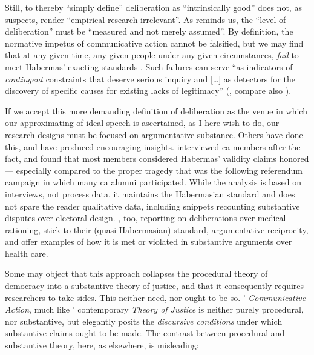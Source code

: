Still, to thereby ``simply define'' deliberation as ``intrinsically good'' does not, as \citet[524]{Mutz2008} suspects, render ``empirical research irrelevant''.
As \citet[13]{Steiner2012} reminds us, the ``level of deliberation'' must be ``measured and not merely assumed''.
By definition, the normative impetus of communicative action cannot be falsified, but we may find that at any given time, any given people under any given circumstances, \emph{fail} to meet Habermas' exacting standards \citep[499]{Thompson2008}.
Such failures can serve ``as indicators of \emph{contingent} constraints that deserve serious inquiry and [\ldots] as detectors for the discovery of specific causes for existing lacks of legitimacy'' (\citealt[420, emphasis in original]{Habermas2006}, compare also \citealt[502]{Thompson2008}).

If we accept this more demanding definition of deliberation as the venue in which our approximating of ideal speech is ascertained, as I here wish to do, our research designs must be focused on argumentative substance.
Others have done this, and have produced encouraging insights.
\cite{Ratner-2008-aa} interviewed \gls{ca} members after the fact, and found that most members considered Habermas' validity claims honored --- especially compared to the proper tragedy that was the following referendum campaign in which many \gls{ca} alumni participated.
While the analysis is based on interviews, not process data, it maintains the Habermasian standard and does not spare the reader qualitative data, including snippets recounting substantive disputes over electoral design.
\cite{GutmannThompson-2004-aa}, too, reporting on deliberations over medical rationing, stick to their (quasi-Habermasian) standard, argumentative reciprocity, and offer examples of how it is met or violated in substantive arguments over health care.

Some may object that this approach collapses the procedural theory of democracy into a substantive theory of justice, and that it consequently requires researchers to take sides.
This neither need, nor ought to be so.
\citeauthor{Habermas-1984}' \emph{Communicative Action}, much like \citeauthor{Rawls-1971}' contemporary \emph{Theory of Justice} is neither purely procedural, nor substantive, but elegantly posits the \emph{discursive conditions} under which substantive claims ought to be made.
The contrast between procedural and substantive theory, here, as elsewhere, is misleading:

